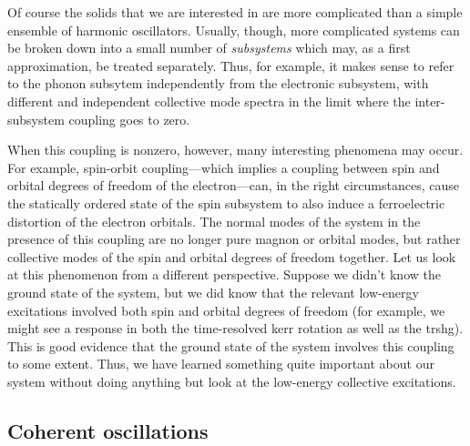 Of course the solids that we are interested in are more complicated than a simple ensemble of harmonic oscillators.
Usually, though, more complicated systems can be broken down into a small number of \emph{subsystems} which may, as a first approximation, be treated separately.
Thus, for example, it makes sense to refer to the phonon subsytem independently from the electronic subsystem, with different and independent collective mode spectra in the limit where the inter-subsystem coupling goes to zero.

When this coupling is nonzero, however, many interesting phenomena may occur.
For example, spin-orbit coupling---which implies a coupling between spin and orbital degrees of freedom of the electron---can, in the right circumstances, cause the statically ordered state of the spin subsystem to also induce a ferroelectric distortion of the electron orbitals.
The normal modes of the system in the presence of this coupling are no longer pure magnon or orbital modes, but rather collective modes of the spin and orbital degrees of freedom together.
Let us look at this phenomenon from a different perspective.
Suppose we didn't know the ground state of the system, but we did know that the relevant low-energy excitations involved both spin and orbital degrees of freedom (for example, we might see a response in both the time-resolved kerr rotation as well as the \gls{trshg}).
This is good evidence that the ground state of the system involves this coupling to some extent.
Thus, we have learned something quite important about our system without doing anything but look at the low-energy collective excitations.

\subsection{Coherent oscillations}\label{sec:coherentoscillations}

